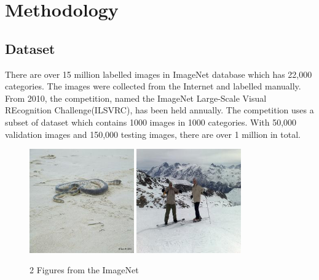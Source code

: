 
\chapter{Methodology} %
\label{Chapter3}

\section{Dataset}

There are over 15 million labelled images in ImageNet database which has 22,000 categories. The images were collected from the Internet and labelled manually. From 2010, the competition, named the ImageNet Large-Scale Visual REcognition Challenge(ILSVRC), has been held annually. The competition uses a subset of dataset which contains 1000 images in 1000 categories. With 50,000 validation images and 150,000 testing images, there are over 1 million in total.
\graphicspath{ {./Figures/} }
\begin{figure}[!htb]
    \centering
	\includegraphics[width=0.4\textwidth]{ILSVRC2012_val_00000001.JPEG}
    \qquad
    \includegraphics[width=0.4\textwidth]{ILSVRC2012_val_00000002.JPEG}
    \caption{2 Figures from the ImageNet}%
    \label{fig:ImageNetExamples}%
\end{figure}

